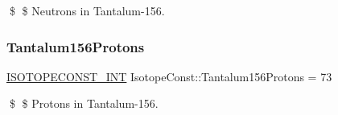 \$ \$ Neutrons in Tantalum-\/156. \mbox{\label{group___isotope_const-_tantalum-_ta156_ga46a64adf8cbef390dc0018d79a3ed336}} 
\subsubsection{\texorpdfstring{Tantalum156\+Protons}{Tantalum156Protons}}
{\footnotesize\ttfamily \mbox{\hyperlink{group___isotope_const-_macros_ga5f18360b3e99483a35c32d789e62621c}{I\+S\+O\+T\+O\+P\+E\+C\+O\+N\+S\+T\+\_\+\+I\+NT}} Isotope\+Const\+::\+Tantalum156\+Protons = 73}

\$ \$ Protons in Tantalum-\/156. 